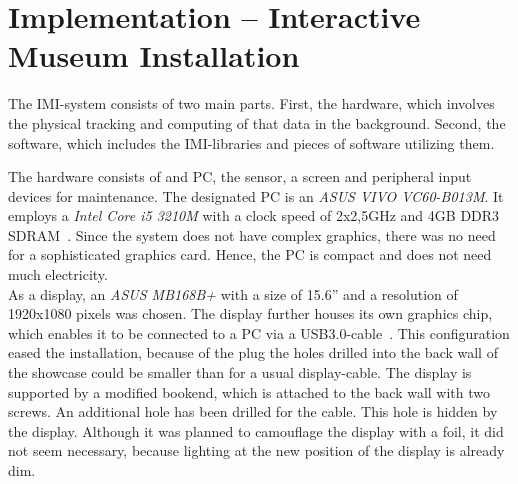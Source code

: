 \chapter{Implementation -- Interactive Museum Installation}
\label{implementation}

The \ac{IMI}-system consists of two main parts. First, the hardware, which involves the physical tracking and computing of that data in the background. Second, the software, which includes the \ac{IMI}-libraries and pieces of software utilizing them.

%


The hardware consists of and PC, the sensor, a screen and peripheral input devices for maintenance. The designated PC is an \textit{ASUS VIVO VC60-B013M}. It employs a \textit{Intel Core i5 3210M} with a clock speed of 2x2,5GHz and 4GB DDR3 SDRAM~\cite{VivoPCVC60}. Since the system does not have complex graphics, there was no need for a sophisticated graphics card. Hence, the PC is compact and does not need much electricity. 
\\
As a display, an \textit{ASUS MB168B+} with a size of 15.6'' and a resolution of 1920x1080 pixels was chosen. The display further houses its own graphics chip, which enables it to be connected to a PC via a USB3.0-cable~\cite{MB168B}. This configuration eased the installation, because of the plug the holes drilled into the back wall of the showcase could be smaller than for a usual display-cable. The display is supported by a modified bookend, which is attached to the back wall with two screws. An additional hole has been drilled for the cable. This hole is hidden by the display. Although it was planned to camouflage the display with a foil, it did not seem necessary, because lighting at the new position of the display is already dim.

